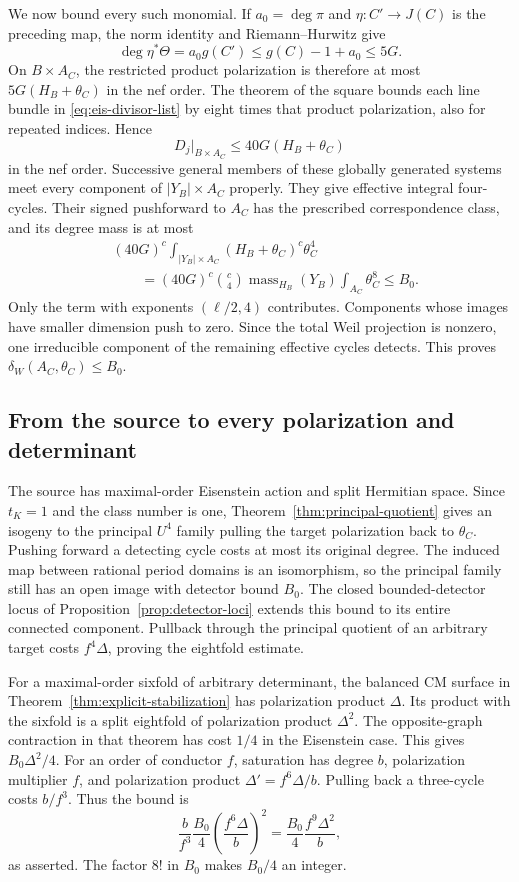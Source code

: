\documentclass[11pt]{article}
\theoremstyle{definition}
\theoremstyle{remark}
\begin{document}
We now bound every such monomial. If $a_0=\deg\pi$ and
$\eta:C'\to J(C)$ is the preceding map, the norm identity and
Riemann--Hurwitz give
\[
 \deg\eta^*\Theta=a_0g(C')
 \le g(C)-1+a_0\le5G.
\]
On $B\times A_C$, the restricted product polarization is therefore
at most $5G(H_B+\theta_C)$ in the nef order. The theorem of the
square bounds each line bundle in \eqref{eq:eis-divisor-list} by eight
times that product polarization, also for repeated indices. Hence
\[
 D_j|_{B\times A_C}\le40G(H_B+\theta_C)
\]
in the nef order. Successive general members of these globally
generated systems meet every component of $|Y_B|\times A_C$
properly. They give effective integral four-cycles. Their signed
pushforward to $A_C$ has the prescribed correspondence class, and
its degree mass is at most
\begin{align*}
 &(40G)^c\int_{|Y_B|\times A_C}
                    (H_B+\theta_C)^c\theta_C^4\\
 &\qquad=(40G)^c\binom c4
              \operatorname{mass}_{H_B}(Y_B)
              \int_{A_C}\theta_C^8
 \le B_0.
\end{align*}
Only the term with exponents $(\ell/2,4)$ contributes. Components
whose images have smaller dimension push to zero. Since the total
Weil projection is nonzero, one irreducible component of the remaining
effective cycles detects. This proves $\delta_W(A_C,\theta_C)\le B_0$.

\subsection{From the source to every polarization and determinant}

The source has maximal-order Eisenstein action and split Hermitian
space. Since $t_K=1$ and the class number is one,
Theorem~\ref{thm:principal-quotient} gives an isogeny to the principal
$U^4$ family pulling the target polarization back to $\theta_C$.
Pushing forward a detecting cycle costs at most its original degree.
The induced map between rational period domains is an isomorphism,
so the principal family still has an open image with detector bound
$B_0$. The closed bounded-detector locus of
Proposition~\ref{prop:detector-loci} extends this bound to its entire
connected component. Pullback through the principal quotient of an
arbitrary target costs $f^4\Delta$, proving the eightfold estimate.

For a maximal-order sixfold of arbitrary determinant, the balanced CM
surface in Theorem~\ref{thm:explicit-stabilization} has polarization
product $\Delta$. Its product with the sixfold is a split eightfold
of polarization product $\Delta^2$. The opposite-graph contraction
in that theorem has cost $1/4$ in the Eisenstein case. This gives
$B_0\Delta^2/4$. For an order of conductor $f$, saturation has degree
$b$, polarization multiplier $f$, and polarization product
$\Delta'=f^6\Delta/b$. Pulling back a three-cycle costs $b/f^3$.
Thus the bound is
\[
 \frac b{f^3}\frac{B_0}{4}
       \left(\frac{f^6\Delta}{b}\right)^2
 =\frac{B_0}{4}\frac{f^9\Delta^2}{b},
\]
as asserted. The factor $8!$ in $B_0$ makes $B_0/4$ an integer.
\end{document}
